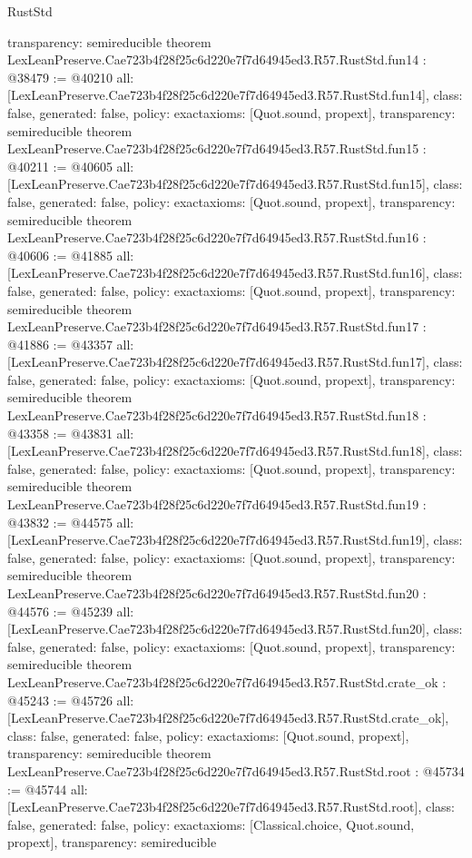 \begin{lexlean}{RustStd}
\begin{coremodule}
{  transparency: semireducible
}
theorem LexLeanPreserve.Cae723b4f28f25c6d220e7f7d64945ed3.R57.RustStd.fun14 : @38479 := @40210 {
  all: [LexLeanPreserve.Cae723b4f28f25c6d220e7f7d64945ed3.R57.RustStd.fun14],
  class: false,
  generated: false,
  policy: exact{axioms: [Quot.sound, propext]},
  transparency: semireducible
}
theorem LexLeanPreserve.Cae723b4f28f25c6d220e7f7d64945ed3.R57.RustStd.fun15 : @40211 := @40605 {
  all: [LexLeanPreserve.Cae723b4f28f25c6d220e7f7d64945ed3.R57.RustStd.fun15],
  class: false,
  generated: false,
  policy: exact{axioms: [Quot.sound, propext]},
  transparency: semireducible
}
theorem LexLeanPreserve.Cae723b4f28f25c6d220e7f7d64945ed3.R57.RustStd.fun16 : @40606 := @41885 {
  all: [LexLeanPreserve.Cae723b4f28f25c6d220e7f7d64945ed3.R57.RustStd.fun16],
  class: false,
  generated: false,
  policy: exact{axioms: [Quot.sound, propext]},
  transparency: semireducible
}
theorem LexLeanPreserve.Cae723b4f28f25c6d220e7f7d64945ed3.R57.RustStd.fun17 : @41886 := @43357 {
  all: [LexLeanPreserve.Cae723b4f28f25c6d220e7f7d64945ed3.R57.RustStd.fun17],
  class: false,
  generated: false,
  policy: exact{axioms: [Quot.sound, propext]},
  transparency: semireducible
}
theorem LexLeanPreserve.Cae723b4f28f25c6d220e7f7d64945ed3.R57.RustStd.fun18 : @43358 := @43831 {
  all: [LexLeanPreserve.Cae723b4f28f25c6d220e7f7d64945ed3.R57.RustStd.fun18],
  class: false,
  generated: false,
  policy: exact{axioms: [Quot.sound, propext]},
  transparency: semireducible
}
theorem LexLeanPreserve.Cae723b4f28f25c6d220e7f7d64945ed3.R57.RustStd.fun19 : @43832 := @44575 {
  all: [LexLeanPreserve.Cae723b4f28f25c6d220e7f7d64945ed3.R57.RustStd.fun19],
  class: false,
  generated: false,
  policy: exact{axioms: [Quot.sound, propext]},
  transparency: semireducible
}
theorem LexLeanPreserve.Cae723b4f28f25c6d220e7f7d64945ed3.R57.RustStd.fun20 : @44576 := @45239 {
  all: [LexLeanPreserve.Cae723b4f28f25c6d220e7f7d64945ed3.R57.RustStd.fun20],
  class: false,
  generated: false,
  policy: exact{axioms: [Quot.sound, propext]},
  transparency: semireducible
}
theorem LexLeanPreserve.Cae723b4f28f25c6d220e7f7d64945ed3.R57.RustStd.crate_ok : @45243 := @45726 {
  all: [LexLeanPreserve.Cae723b4f28f25c6d220e7f7d64945ed3.R57.RustStd.crate_ok],
  class: false,
  generated: false,
  policy: exact{axioms: [Quot.sound, propext]},
  transparency: semireducible
}
theorem LexLeanPreserve.Cae723b4f28f25c6d220e7f7d64945ed3.R57.RustStd.root : @45734 := @45744 {
  all: [LexLeanPreserve.Cae723b4f28f25c6d220e7f7d64945ed3.R57.RustStd.root],
  class: false,
  generated: false,
  policy: exact{axioms: [Classical.choice, Quot.sound, propext]},
  transparency: semireducible
}


\end{coremodule}
\end{lexlean}
